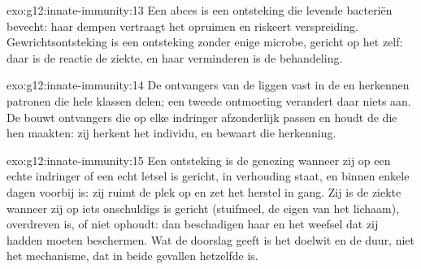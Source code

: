 \begin{solution}{exo:g12:innate-immunity:13}
Een abces is een ontsteking die levende bacteriën bevecht: haar dempen
vertraagt het opruimen en riskeert verspreiding. Gewrichtsontsteking is
een ontsteking zonder enige microbe, gericht op het  zelf: daar is
de reactie de ziekte, en haar verminderen is de behandeling.
\end{solution}

\begin{solution}{exo:g12:innate-immunity:14}
De ontvangers van de  liggen vast in de  en herkennen
patronen die hele klassen delen; een tweede ontmoeting verandert daar
niets aan. De  bouwt ontvangers die op elke indringer
afzonderlijk passen en houdt de  die hen maakten: zij herkent het
individu, en bewaart die herkenning.
\end{solution}

\begin{solution}{exo:g12:innate-immunity:15}
Een ontsteking is de genezing wanneer zij op een echte indringer of een
echt letsel is gericht, in verhouding staat, en binnen enkele dagen
voorbij is: zij ruimt de plek op en zet het herstel in gang. Zij is de
ziekte wanneer zij op iets onschuldigs is gericht (stuifmeel, de eigen
 van het lichaam), overdreven is, of niet ophoudt: dan
beschadigen haar  en  het weefsel dat zij hadden moeten
beschermen. Wat de doorslag geeft is het doelwit en de duur, niet het
mechanisme, dat in beide gevallen hetzelfde is.
\end{solution}

